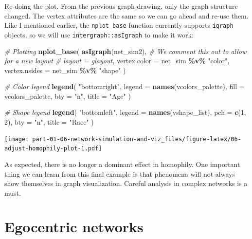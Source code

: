 \documentclass[
]{book}
\newenvironment{Shaded}{\begin{snugshade}}{\end{snugshade}}
\newcommand{\AttributeTok}[1]{\textcolor[rgb]{0.13,0.29,0.53}{#1}}
\newcommand{\CommentTok}[1]{\textcolor[rgb]{0.56,0.35,0.01}{\textit{#1}}}
\newcommand{\DecValTok}[1]{\textcolor[rgb]{0.00,0.00,0.81}{#1}}
\newcommand{\FunctionTok}[1]{\textcolor[rgb]{0.13,0.29,0.53}{\textbf{#1}}}
\newcommand{\NormalTok}[1]{#1}
\newcommand{\SpecialCharTok}[1]{\textcolor[rgb]{0.81,0.36,0.00}{\textbf{#1}}}
\newcommand{\StringTok}[1]{\textcolor[rgb]{0.31,0.60,0.02}{#1}}
\begin{document}
Re-doing the plot. From the previous graph-drawing, only the graph structure
changed. The vertex attributes are the same so we can go ahead and re-use them.
Like I mentioned earlier, the \texttt{nplot\_base} function currently supports \texttt{igraph}
objects, so we will use \texttt{intergraph::asIgraph} to make it work:

\begin{Shaded}
\begin{Highlighting}[]
\CommentTok{\# Plotting}
\FunctionTok{nplot\_base}\NormalTok{(}
  \FunctionTok{asIgraph}\NormalTok{(net\_sim2),}
  \CommentTok{\# We comment this out to allow for a new layout}
  \CommentTok{\# layout = glayout, }
  \AttributeTok{vertex.color =}\NormalTok{ net\_sim }\SpecialCharTok{\%v\%} \StringTok{"color"}\NormalTok{,}
  \AttributeTok{vertex.nsides =}\NormalTok{ net\_sim }\SpecialCharTok{\%v\%} \StringTok{"shape"}
\NormalTok{  )}

\CommentTok{\# Color legend}
\FunctionTok{legend}\NormalTok{(}
  \StringTok{"bottomright"}\NormalTok{,}
  \AttributeTok{legend =} \FunctionTok{names}\NormalTok{(vcolors\_palette),}
  \AttributeTok{fill   =}\NormalTok{ vcolors\_palette, }
  \AttributeTok{bty    =} \StringTok{"n"}\NormalTok{,}
  \AttributeTok{title  =} \StringTok{"Age"}
\NormalTok{  )}

\CommentTok{\# Shape legend}
\FunctionTok{legend}\NormalTok{(}
  \StringTok{"bottomleft"}\NormalTok{,}
  \AttributeTok{legend =} \FunctionTok{names}\NormalTok{(vshape\_list),}
  \AttributeTok{pch    =} \FunctionTok{c}\NormalTok{(}\DecValTok{1}\NormalTok{, }\DecValTok{2}\NormalTok{), }
  \AttributeTok{bty    =} \StringTok{"n"}\NormalTok{,}
  \AttributeTok{title  =} \StringTok{"Race"}
\NormalTok{  )}
\end{Highlighting}
\end{Shaded}

\texttt{[image: part-01-06-network-simulation-and-viz\_files/figure-latex/06-adjust-homophily-plot-1.pdf]}

As expected, there is no longer a dominant effect in homophily. One important
thing we can learn from this final example is that phenomena will not always
show themselves in graph visualization. Careful analysis in complex networks
is a must.

\hypertarget{egocentric-networks}{%
\chapter{Egocentric networks}\label{egocentric-networks}}
\end{document}
